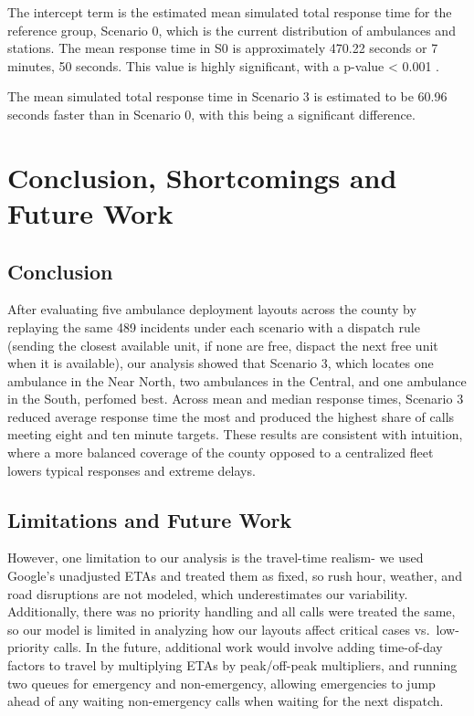 \documentclass[
]{article}
\begin{document}
The intercept term is the estimated mean simulated total response time
for the reference group, Scenario 0, which is the current distribution
of ambulances and stations. The mean response time in S0 is
approximately 470.22 seconds or 7 minutes, 50 seconds. This value is
highly significant, with a p-value \textless{} 0.001 .

The mean simulated total response time in Scenario 3 is estimated to be
60.96 seconds faster than in Scenario 0, with this being a significant
difference.

\section{Conclusion, Shortcomings and Future
Work}\label{conclusion-shortcomings-and-future-work}

\subsection{Conclusion}\label{conclusion}

After evaluating five ambulance deployment layouts across the county by
replaying the same 489 incidents under each scenario with a dispatch
rule (sending the closest available unit, if none are free, dispact the
next free unit when it is available), our analysis showed that Scenario
3, which locates one ambulance in the Near North, two ambulances in the
Central, and one ambulance in the South, perfomed best. Across mean and
median response times, Scenario 3 reduced average response time the most
and produced the highest share of calls meeting eight and ten minute
targets. These results are consistent with intuition, where a more
balanced coverage of the county opposed to a centralized fleet lowers
typical responses and extreme delays.

\subsection{Limitations and Future
Work}\label{limitations-and-future-work}

However, one limitation to our analysis is the travel-time realism- we
used Google's unadjusted ETAs and treated them as fixed, so rush hour,
weather, and road disruptions are not modeled, which underestimates our
variability. Additionally, there was no priority handling and all calls
were treated the same, so our model is limited in analyzing how our
layouts affect critical cases vs.~low-priority calls. In the future,
additional work would involve adding time-of-day factors to travel by
multiplying ETAs by peak/off-peak multipliers, and running two queues
for emergency and non-emergency, allowing emergencies to jump ahead of
any waiting non-emergency calls when waiting for the next dispatch.
\end{document}
